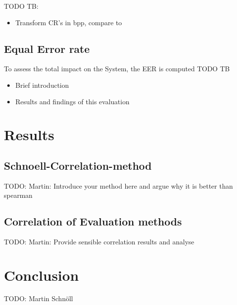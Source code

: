 \documentclass[10pt,twocolumn,letterpaper]{article}
\begin{document}
TODO TB:
\begin{itemize}
 \item Transform CR's in bpp, compare to \cite{severeCompression}
\end{itemize}


\subsection{Equal Error rate}
To assess the total impact on the System, the EER is computed
TODO TB

\begin{itemize}
 \item Brief introduction
 \item Results and findings of this evaluation
\end{itemize}


\section{Results}
\subsection{Schnoell-Correlation-method}
TODO: Martin: Introduce your method here and argue why it is better than spearman

\subsection{Correlation of Evaluation methods}
TODO: Martin:
Provide sensible correlation results and analyse


\section{Conclusion}
TODO: Martin Schnöll


{\small


}
\end{document}
